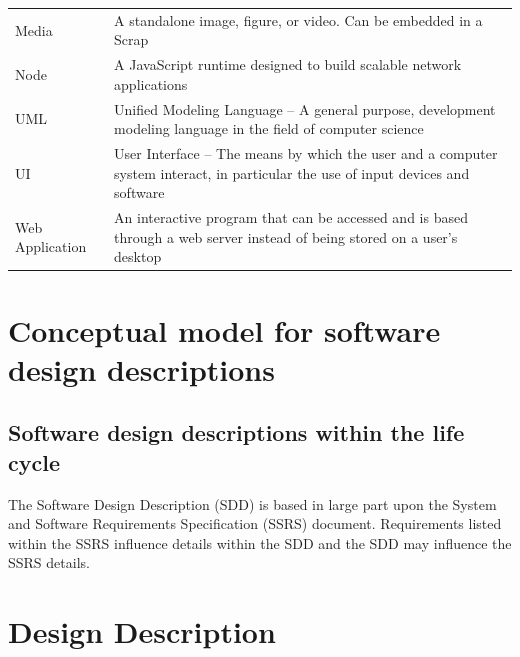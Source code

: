 \documentclass[onecolumn, draftclsnofoot,10pt, compsoc]{IEEEtran}
\begin{document}
\begin{center}
\begin{supertabular}{p{3cm}p{12cm}}
	Media 
	& A standalone image, figure, or video. Can be embedded in a Scrap\\

	Node 
	& A JavaScript runtime designed to build scalable network applications\\

	UML 
	& Unified Modeling Language -- A general purpose, development 
	modeling language in the field of computer science\\

	UI  
	& User Interface -- The means by which the user and a 
	computer system interact, in particular the use of input 
	devices and software\\

	Web Application 
	& An interactive program that can be accessed and is based through 
	a web server instead of being stored on a user's desktop\\

\end{supertabular}

\end{center}



\section{Conceptual model for software design descriptions}



\subsection{Software design descriptions within the life cycle}
\noindent The Software Design Description (SDD) is based in large part upon
the System and Software Requirements Specification (SSRS) document.
Requirements listed within the SSRS influence details within the SDD and
the SDD may influence the SSRS details. \\


\section{Design Description}
\end{document}
